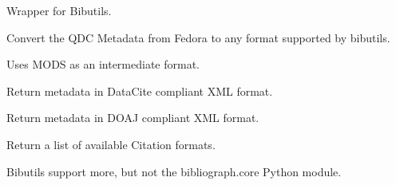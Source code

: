 \documentclass[a4paper,10pt,ngerman]{sphinxmanual}
\begin{document}
\label{tools:module-Products.DiPP.BibTool}

\begin{fulllineitems}
\label{tools:Products.DiPP.BibTool.BibTool}
Wrapper for Bibutils.

\begin{fulllineitems}
\label{tools:Products.DiPP.BibTool.BibTool.convert}
Convert the QDC Metadata from Fedora to any format supported by bibutils.

Uses MODS as an intermediate format.

\end{fulllineitems}


\begin{fulllineitems}
\label{tools:Products.DiPP.BibTool.BibTool.datacite_xml}
Return metadata in DataCite compliant  XML format.

\end{fulllineitems}


\begin{fulllineitems}
\label{tools:Products.DiPP.BibTool.BibTool.doaj_xml}
Return metadata in DOAJ compliant  XML format.

\end{fulllineitems}


\begin{fulllineitems}
\label{tools:Products.DiPP.BibTool.BibTool.formats}
Return a list of available Citation formats.

Bibutils support more, but not the bibliograph.core Python module.

\end{fulllineitems}


\end{fulllineitems}
\end{document}
